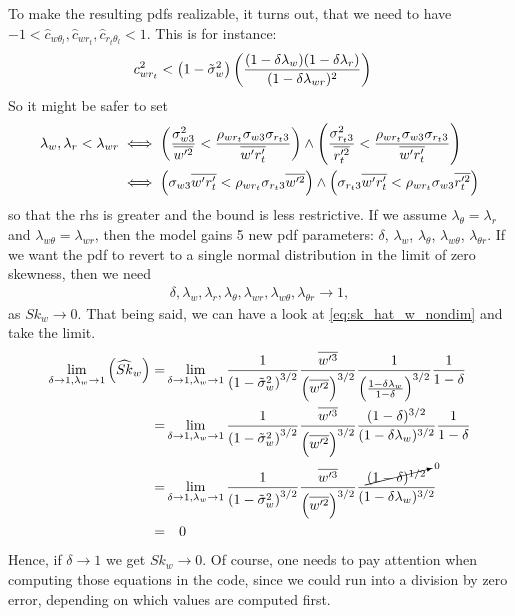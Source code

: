 To make the resulting \glspl{pdf} realizable, it turns out\autocite{larson2022clubbsilhs}, that we need to have
$-1 < \widehat{c}_{w \theta_l}, \widehat{c}_{w r_t}, \widehat{c}_{r_t \theta_l} < 1$.
This is for instance:
\begin{align}
    c_{w r_t}^2 &< \left( 1 - \tilde{\sigma}_w^2 \right) \left(
    \frac{(1-\delta \lambda_w)(1-\delta \lambda_r)}{(1-\delta \lambda_{w r})^2}
    \right)
\end{align}
So it might be safer to set
\begin{align}
    \label{eq:lambda_corr_ineq}
    \lambda_w , \lambda_r < \lambda_{w r}
    &\iff
    \left(\frac{\sigma_{w 3}^2}{\overline{w'^2}} < \frac{\rho_{w r_t} \sigma_{w 3} \sigma_{r_t 3}}{\overline{w' r_t'}}\right)
    \land
    \left(\frac{\sigma_{r_t 3}^2}{\overline{r_t'^2}} < \frac{\rho_{w r_t} \sigma_{w 3} \sigma_{r_t 3}}{\overline{w' r_t'}}\right) \nonumber\\
    &\iff
    \left(\sigma_{w 3} \overline{w' r_t'} < \rho_{w r_t} \sigma_{r_t 3} \overline{w'^2}\right)
    \land
    \left(\sigma_{r_t 3} \overline{w' r_t'} < \rho_{w r_t} \sigma_{w 3} \overline{r_t'^2}\right) \nonumber\\
\end{align}
so that the \gls{rhs} is greater and the bound is less restrictive.
If we assume $\lambda_\theta = \lambda_r$ and $\lambda_{w\theta} = \lambda_{wr}$,
then the model gains 5 new \gls{pdf} parameters:
$\delta$, $\lambda_w$, $\lambda_\theta$, $\lambda_{w \theta}$, $\lambda_{\theta r}$.
If we want the \gls{pdf} to revert to a single normal distribution in the limit of zero skewness,
then we need
\begin{align}
    \delta, \lambda_w, \lambda_r, \lambda_\theta,
    \lambda_{w r}, \lambda_{w \theta}, \lambda_{\theta r}
    \to 1,
\end{align}
as $Sk_w \to 0$.
That being said, we can have a look at \cref{eq:sk_hat_w_nondim} and take the limit.
\begin{align}
    \lim_{\delta \to 1, \lambda_w \to 1}\left(\widehat{Sk}_w\right)
    =&\lim_{\delta \to 1, \lambda_w \to 1}
    \frac{1}{\left( 1 - \tilde{\sigma}_w^2 \right)^{3/2}}
    \frac{\overline{w'^3}}{\left(\overline{w'^2} \right)^{3/2}}
    \frac{1}{\left(\frac{1-\delta \lambda_w}{1-\delta}\right)^{3/2}}
    \frac{1}{1-\delta} \nonumber \\
    =&\lim_{\delta \to 1, \lambda_w \to 1}
    \frac{1}{\left( 1 - \tilde{\sigma}_w^2 \right)^{3/2}}
    \frac{\overline{w'^3}}{\left(\overline{w'^2} \right)^{3/2}}
    \frac{(1-\delta)^{3/2}}{(1-\delta \lambda_w)^{3/2}}
    \frac{1}{1-\delta} \nonumber \\
    =&\lim_{\delta \to 1, \lambda_w \to 1}
    \frac{1}{\left( 1 - \tilde{\sigma}_w^2 \right)^{3/2}}
    \frac{\overline{w'^3}}{\left(\overline{w'^2} \right)^{3/2}}
    \frac{\cancelto{0}{(1-\delta)^{1/2}}}{(1-\delta \lambda_w)^{3/2}}
    \nonumber \\
    =& \quad 0
\end{align}
Hence, if $\delta \to 1$ we get $Sk_w \to 0$.
Of course, one needs to pay attention when computing those equations in the code,
since we could run into a division by zero error,
depending on which values are computed first.

